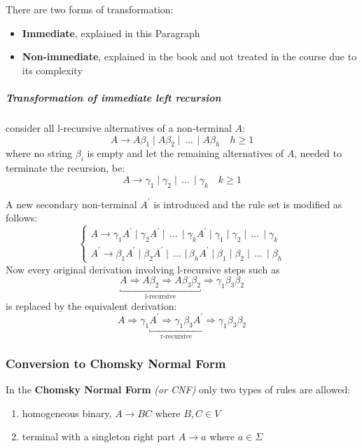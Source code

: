 \documentclass[english]{article}
\begin{document}
There are two forms of transformation:
\begin{itemize}
  \item \textbf{Immediate}, explained in this Paragraph
  \item \textbf{Non-immediate}, explained in the book and not treated in the course due to its complexity
\end{itemize}

\subparagraph*{Transformation of immediate left recursion}

consider all l-recursive alternatives of a non-terminal \(A\):
\[ A \rightarrow A \beta_1 \mid A \beta_2 \mid \,\ldots\, \mid A \beta_h \quad h \geq 1 \]
where no string \(\beta_i\) is empty and let the remaining alternatives of \(A\), needed to terminate the recursion, be:
\[ A \rightarrow \gamma_1 \mid \gamma_2 \mid \,\ldots\, \mid \gamma_k \quad k \geq 1 \]

A new secondary non-terminal \(A^\prime\) is introduced and the rule set is modified as follows:
\[\begin{cases}
    A \rightarrow \gamma_1 A^\prime \mid \gamma_2 A^\prime \mid \,\ldots\, \mid \gamma_k A^\prime \mid \gamma_1 \mid \gamma_2 \mid \,\ldots\, \mid \gamma_k \\
    A^\prime \rightarrow \beta_1 A^\prime \mid \beta_2 A^\prime \mid \,\ldots\, \, |\, \beta_h A^\prime \mid \beta_1 \mid \beta_2 \mid \,\ldots\, \mid \beta_h
  \end{cases}\]
Now every original derivation involving l-recursive steps such as
\[\underbracket{A \Rightarrow A \beta_2 \Rightarrow A \beta_3 \beta_2}_{\text{l-recursive}} \Rightarrow \gamma_1 \beta_3 \beta_2 \]
is replaced by the equivalent derivation:
\[A \Rightarrow \gamma_1 \underbracket{A^\prime \Rightarrow \gamma_1 \beta_3 A^\prime}_{\text{r-recursive}} \Rightarrow \gamma_1 \beta_3 \beta_2 \]

\subsubsection{Conversion to Chomsky Normal Form}
\label{sec:conversion-to-chomsky-normal-form}

In the \textbf{Chomsky Normal Form} \textit{(or CNF)} only two types of rules are allowed:

\begin{enumerate}
  \item homogeneous binary, \(A \rightarrow BC\) where \(B, C \in V\)
  \item terminal with a singleton right part \(A \rightarrow a\) where \(a \in \Sigma\)
\end{enumerate}
\end{document}
